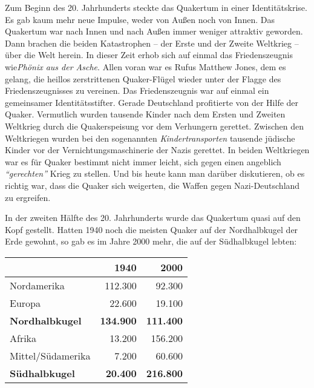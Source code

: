 Zum Beginn des 20. Jahrhunderts steckte das Quakertum in einer Identitätskrise.
Es gab kaum mehr neue Impulse, weder von Außen
noch von Innen. Das Quakertum war
nach Innen und nach Außen immer weniger attraktiv geworden. Dann brachen die
beiden Katastrophen -- der Erste und der Zweite Weltkrieg --
über die Welt
herein. In dieser Zeit erhob sich auf einmal das Friedenszeugnis wie\textit{Phönix aus der Asche}. Allen voran war es Rufus Matthew Jones, dem
es gelang, die heillos zerstrittenen Quaker-Flügel wieder unter der Flagge des
Friedenszeugnisses zu vereinen. Das Friedenszeugnis war auf einmal ein
gemeinsamer Identitätsstifter. Gerade Deutschland profitierte von der Hilfe der
Quaker. Vermutlich wurden tausende Kinder nach dem Ersten und Zweiten Weltkrieg
durch die Quakerspeisung vor dem Verhungern gerettet.
Zwischen den Weltkriegen
wurden bei den sogenannten \textit{Kindertransporten}
tausende jüdische Kinder
vor der Vernichtungsmaschinerie der Nazis gerettet. In beiden Weltkriegen war es
für Quaker bestimmt nicht immer leicht, sich gegen einen
angeblich \textit{"`gerechten"'}
Krieg zu stellen. Und bis heute kann man darüber diskutieren, ob es richtig
war, dass die Quaker sich weigerten, die Waffen gegen Nazi-Deutschland zu
ergreifen.

\medskip

In der zweiten Hälfte des 20. Jahrhunderts wurde das Quakertum quasi auf den
Kopf
gestellt. Hatten 1940 noch die meisten Quaker auf der Nordhalbkugel der Erde
gewohnt, so gab es im Jahre 2000 mehr, die auf der Südhalbkugel lebten:

\begin{center}
\begin{tabular}{|l|r|r|} \hline
                        & \textbf{1940}        & \textbf{2000}    \\ \hline
\hline
Nordamerika             & 112.300              & 92.300           \\ \hline
Europa                  & 22.600               & 19.100           \\ \hline
\textbf{Nordhalbkugel}  & \textbf{134.900}     & \textbf{111.400} \\ \hline
Afrika                  & 13.200               & 156.200          \\ \hline
Mittel/Südamerika       & 7.200                & 60.600           \\ \hline
\textbf{Südhalbkugel}   & \textbf{20.400}      & \textbf{216.800} \\ \hline
\end{tabular}
\end{center}


